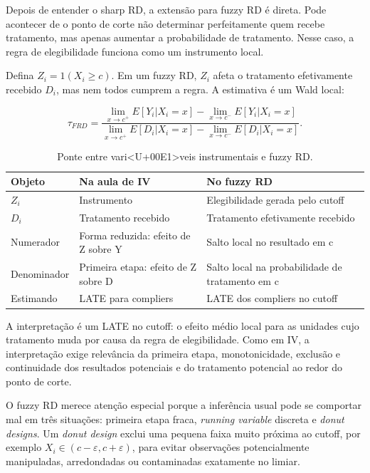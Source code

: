 \documentclass[
]{article}
\begin{document}
Depois de entender o sharp RD, a extensão para fuzzy RD é direta. Pode acontecer de o ponto de corte não determinar perfeitamente quem recebe tratamento, mas apenas aumentar a probabilidade de tratamento. Nesse caso, a regra de elegibilidade funciona como um instrumento local.

Defina \(Z_i = 1(X_i \geq c)\). Em um fuzzy RD, \(Z_i\) afeta o tratamento efetivamente recebido \(D_i\), mas nem todos cumprem a regra. A estimativa é um Wald local:

\[
\tau_{FRD} =
\frac{\lim_{x \to c^+} E[Y_i|X_i=x] - \lim_{x \to c^-} E[Y_i|X_i=x]}
{\lim_{x \to c^+} E[D_i|X_i=x] - \lim_{x \to c^-} E[D_i|X_i=x]}.
\]

\begin{table}

\caption{\label{tab:tabela-ponte-fuzzy-iv}Ponte entre vari<U+00E1>veis instrumentais e fuzzy RD.}
\centering
\begin{tabular}[t]{l|l|l}
\hline
Objeto & Na aula de IV & No fuzzy RD\\
\hline
$Z_i$ & Instrumento & Elegibilidade gerada pelo cutoff\\
\hline
$D_i$ & Tratamento recebido & Tratamento efetivamente recebido\\
\hline
Numerador & Forma reduzida: efeito de Z sobre Y & Salto local no resultado em c\\
\hline
Denominador & Primeira etapa: efeito de Z sobre D & Salto local na probabilidade de tratamento em c\\
\hline
Estimando & LATE para compliers & LATE dos compliers no cutoff\\
\hline
\end{tabular}
\end{table}

A interpretação é um LATE no cutoff: o efeito médio local para as unidades cujo tratamento muda por causa da regra de elegibilidade. Como em IV, a interpretação exige relevância da primeira etapa, monotonicidade, exclusão e continuidade dos resultados potenciais e do tratamento potencial ao redor do ponto de corte.

O fuzzy RD merece atenção especial porque a inferência usual pode se comportar mal em três situações: primeira etapa fraca, \emph{running variable} discreta e \emph{donut designs}. Um \emph{donut design} exclui uma pequena faixa muito próxima ao cutoff, por exemplo \(X_i \in (c-\varepsilon, c+\varepsilon)\), para evitar observações potencialmente manipuladas, arredondadas ou contaminadas exatamente no limiar.
\end{document}
